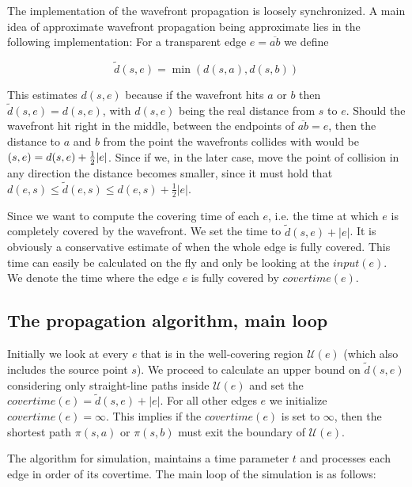 The implementation of the wavefront propagation is loosely synchronized. A main idea of 
approximate wavefront propagation being approximate lies in the following implementation: 
For a transparent edge $e=\overline{ab}$ we define 

$$\tilde{d}(s,e)=\min(d(s,a),d(s,b))$$ 

This estimates $d(s,e)$ because if the wavefront hits $a$ or $b$ then $\tilde{d}(s,e) = 
d(s,e)$, with $d(s,e)$ being the real distance from $s$ to $e$. Should the wavefront hit 
right in the middle, between the endpoints of $\overline{ab} = e$, then the distance to $a$ and 
$b$ from the point the wavefronts collides with would be $\title{d}(s,e)=d(s,e)+\frac{1}
{2}|e|$. Since if we, in the later case, move the point of collision in any direction the 
distance becomes smaller, since it must hold that $d(e,s) \leq \tilde{d}(e,s) \leq d(e,s) + 
\frac{1}{2}|e|$. 

Since we want to compute the covering time of each $e$, i.e. the time at which $e$ is 
completely covered by the wavefront. We set the time to $\tilde{d}(s,e)+|e|$. It is 
obviously a conservative estimate of when the whole edge is fully covered. This time can 
easily be calculated on the fly and only be looking at the $input(e)$. We denote the time 
where the edge $e$ is fully covered by $covertime(e)$. 

\subsection{The propagation algorithm, main loop}

Initially we look at every $e$ that is in the well-covering region $\mathcal{U}(e)$ (which 
also includes the source point $s$). We proceed to calculate an upper bound on $\tilde{d}
(s,e)$ considering only straight-line paths inside $\mathcal{U}(e)$ and set the 
$covertime(e) = \tilde{d}(s,e) + |e|$. For all other edges $e$ we initialize $covertime(e) = 
\infty$. This implies if the $covertime(e)$ is set to $\infty$, then the shortest path 
$\pi(s,a)$ or $\pi(s,b)$ must exit the boundary of $\mathcal{U}(e)$.

The algorithm for simulation, maintains a time parameter $t$ and processes each edge in 
order of its covertime. The main loop of the simulation is as follows:

